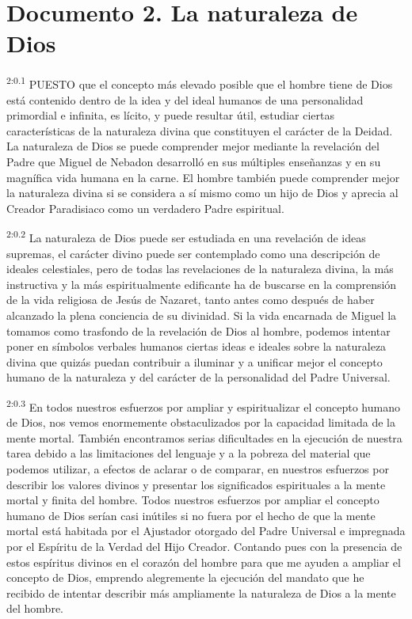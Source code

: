 \chapter{Documento 2. La naturaleza de Dios}
\par
\textsuperscript{2:0.1} PUESTO que el concepto más elevado posible que el hombre tiene de Dios está contenido dentro de la idea y del ideal humanos de una personalidad primordial e infinita, es lícito, y puede resultar útil, estudiar ciertas características de la naturaleza divina que constituyen el carácter de la Deidad. La naturaleza de Dios se puede comprender mejor mediante la revelación del Padre que Miguel de Nebadon desarrolló en sus múltiples enseñanzas y en su magnífica vida humana en la carne. El hombre también puede comprender mejor la naturaleza divina si se considera a sí mismo como un hijo de Dios y aprecia al Creador Paradisiaco como un verdadero Padre espiritual.

\par
\textsuperscript{2:0.2} La naturaleza de Dios puede ser estudiada en una revelación de ideas supremas, el carácter divino puede ser contemplado como una descripción de ideales celestiales, pero de todas las revelaciones de la naturaleza divina, la más instructiva y la más espiritualmente edificante ha de buscarse en la comprensión de la vida religiosa de Jesús de Nazaret, tanto antes como después de haber alcanzado la plena conciencia de su divinidad. Si la vida encarnada de Miguel la tomamos como trasfondo de la revelación de Dios al hombre, podemos intentar poner en símbolos verbales humanos ciertas ideas e ideales sobre la naturaleza divina que quizás puedan contribuir a iluminar y a unificar mejor el concepto humano de la naturaleza y del carácter de la personalidad del Padre Universal.

\par
\textsuperscript{2:0.3} En todos nuestros esfuerzos por ampliar y espiritualizar el concepto humano de Dios, nos vemos enormemente obstaculizados por la capacidad limitada de la mente mortal. También encontramos serias dificultades en la ejecución de nuestra tarea debido a las limitaciones del lenguaje y a la pobreza del material que podemos utilizar, a efectos de aclarar o de comparar, en nuestros esfuerzos por describir los valores divinos y presentar los significados espirituales a la mente mortal y finita del hombre. Todos nuestros esfuerzos por ampliar el concepto humano de Dios serían casi inútiles si no fuera por el hecho de que la mente mortal está habitada por el Ajustador otorgado del Padre Universal e impregnada por el Espíritu de la Verdad del Hijo Creador. Contando pues con la presencia de estos espíritus divinos en el corazón del hombre para que me ayuden a ampliar el concepto de Dios, emprendo alegremente la ejecución del mandato que he recibido de intentar describir más ampliamente la naturaleza de Dios a la mente del hombre.

